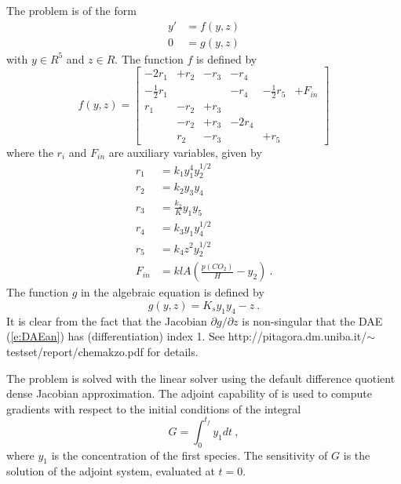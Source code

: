 The problem is of the form
\begin{equation}\label{e:DAEan}
\begin{split}
  y' &= f(y, z) \\
  0  &= g(y, z) 
\end{split}
\end{equation}
with $y \in R^5$ and $z \in R$. The function $f$ is defined by
\begin{equation*}
  f(y, z) = \begin{bmatrix}
    -2r_1           &+r_2 &-r_3 &-r_4  &                &        \\
    -\frac{1}{2}r_1 &     &     &-r_4  &-\frac{1}{2}r_5 &+F_{in} \\
    r_1             &-r_2 &+r_3 &      &                &        \\
                    &-r_2 &+r_3 &-2r_4 &                &        \\
                    &r_2  &-r_3 &      &+r_5            &        
  \end{bmatrix}
\end{equation*}
where the $r_i$ and $F_{in}$ are auxiliary variables, given by
\begin{equation*}
  \begin{split}
    r_1 & = k_1 y_1^4 y_2^{1/2} \\
    r_2 & = k_2 y_3 y_4 \\
    r_3 & = \frac{k_2}{K} y_1 y_5 \\
    r_4 & = k_3 y_1 y_4^{1/2} \\
    r_5 & = k_4 z^2 y_2^{1/2} \\
    F_{in} & = klA \left( \frac{p(CO_2)}{H} - y_2 \right) ~.
  \end{split}
\end{equation*}
The function $g$ in the algebraic equation is defined by
\begin{equation*}
  g(y, z) = K_s y_1 y_4 - z ~.
\end{equation*}
It is clear from the fact that the Jacobian $\partial g / \partial z$ is non-singular
that the DAE (\ref{e:DAEan}) has (differentiation) index 1. 
See http://pitagora.dm.uniba.it/$\sim$testset/report/chemakzo.pdf for details.


The problem is solved with the {\sunlinsoldense} linear solver using the
default difference quotient dense Jacobian approximation.
The adjoint capability of {\idas} is used to compute gradients with
respect to the initial conditions of the integral
\begin{equation*}
  G = \int_0^{t_f} y_1 dt ~,
\end{equation*}
where $y_1$ is the concentration of the first species.  The sensitivity
of $G$ is the solution of the adjoint system, evaluated at $t = 0$.

